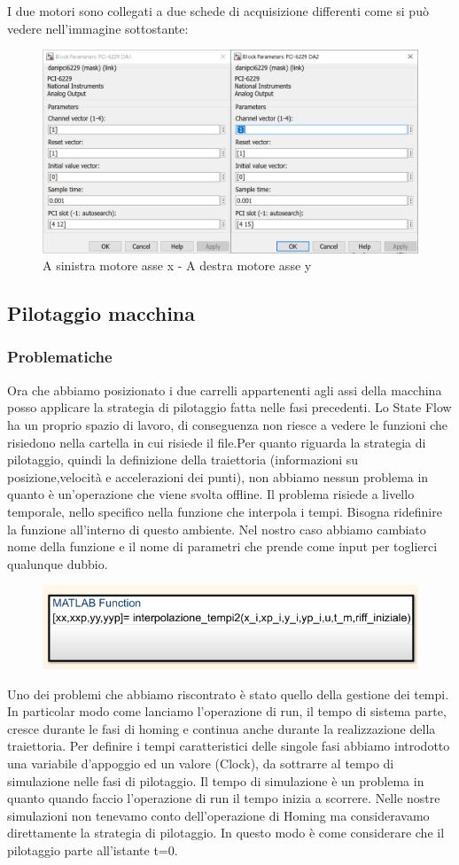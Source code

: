 \documentclass{article}
\begin{document}
I due motori sono collegati a due schede di acquisizione differenti come si può vedere nell'immagine sottostante:

\begin{figure}[H]
\centering
\includegraphics[width=.6\textwidth]{./stateflow/motori.png}
\caption{A sinistra motore asse x - A destra motore asse y}
\end{figure}

\subsection{ Pilotaggio macchina}
\subsubsection{Problematiche}
Ora che abbiamo posizionato i due carrelli appartenenti agli assi della macchina posso applicare la strategia di pilotaggio fatta nelle fasi precedenti. Lo State Flow ha un proprio spazio di lavoro, di conseguenza non riesce a vedere le funzioni che risiedono nella cartella in cui risiede il file.Per quanto riguarda la strategia di pilotaggio, quindi la definizione della traiettoria (informazioni su posizione,velocità e accelerazioni dei punti), non abbiamo nessun problema in quanto è un'operazione che viene svolta offline. Il problema risiede a livello temporale, nello specifico nella funzione che interpola i tempi. Bisogna ridefinire la funzione all'interno di questo ambiente. Nel nostro caso abbiamo cambiato nome della funzione e il nome di parametri che prende come input per toglierci qualunque dubbio.
\begin{figure}[H]
    \centering
    \includegraphics[width=.5\textwidth]{./stateflow/interp.png}
\end{figure}
Uno dei problemi che abbiamo riscontrato è stato quello della gestione dei tempi. In particolar modo come lanciamo l'operazione di run, il tempo di sistema parte, cresce durante le fasi di homing e continua anche durante la realizzazione della traiettoria. Per definire i tempi caratteristici delle singole fasi abbiamo introdotto una variabile d'appoggio ed un valore (Clock), da sottrarre al tempo di simulazione nelle fasi di pilotaggio.
Il tempo di simulazione è un problema in quanto quando faccio l'operazione di run il tempo inizia a scorrere. Nelle nostre simulazioni non tenevamo conto dell'operazione di Homing ma consideravamo direttamente la strategia di pilotaggio. In questo modo è come considerare che il pilotaggio parte all'istante t=0.
\end{document}
